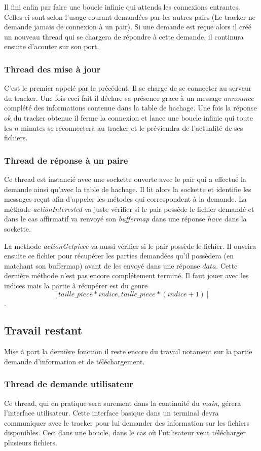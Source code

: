 Il fini enfin par faire une boucle infinie qui attends les connexions entrantes. Celles ci sont selon l'usage courant demandées par les autres pairs (Le tracker ne demande jamais de connexion à un pair). Si une demande est reçue alors il créé un nouveau thread qui se chargera de répondre à cette demande, il continura ensuite d'acouter sur son port.

\subsubsection*{Thread des mise à jour}
C'est le premier appelé par le précédent. Il se charge de se connecter au serveur du tracker. Une fois ceci fait il déclare sa présence grace à un message $announce$ complété des informations contenue dans la table de hachage. 
Une fois la réponse $ok$ du tracker obtenue il ferme la connexion et lance une boucle infinie qui toute les $n$ minutes se reconnectera au tracker et le préviendra de l'actualité de ses fichiers. 

\subsubsection*{Thread de réponse à un paire}
Ce thread est instancié avec une sockette ouverte avec le pair qui a effectué la demande ainsi qu'avec la table de hachage. Il lit alors la sockette et identifie les messages reçut afin d'appeler les métodes qui correspondent à la demande. La méthode \textit{actionInterested} va juste vérifier si le pair possède le fichier demandé et dans le cas affirmatif va renvoyé son \textit{buffermap} dans une réponse $have$ dans la sockette.

La méthode \textit{actionGetpiece} va aussi vérifier si le pair possède le fichier. Il ouvrira ensuite ce fichier pour récupérer les parties demandées qu'il possèdera (en matchant son buffermap) avant de les envoyé dans une réponse $data$.
Cette dernière méthode n'est pas encore complétement terminé. Il faut jouer avec les indices mais la partie à récupérer est du genre $$[taille\_piece*indice,taille\_piece*(indice+1)]$$.


\subsection{Travail restant}
Mise à part la dernière fonction il reste encore du travail notament sur la partie demande d'information et de téléchargement.

\subsubsection*{Thread de demande utilisateur} 
Ce thread, qui en pratique sera surement dans la continuité du \textit{main}, gérera l'interface utilisateur. Cette interface basique dans un terminal devra communiquer avec le tracker pour lui demander des information sur les fichiers disponibles. Ceci dans une boucle, dans le cas où l'utilisateur veut télécharger plusieurs fichiers.

